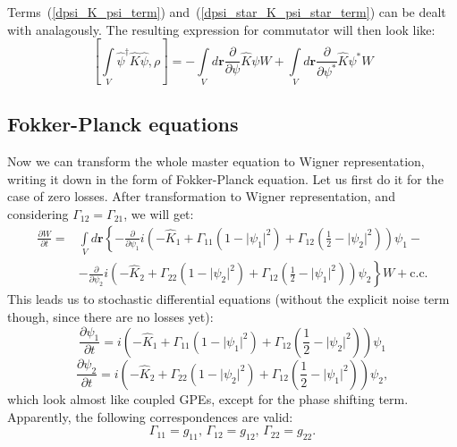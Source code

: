 \documentclass[12pt,notitlepage]{report}
\begin{document}
Terms~(\ref{dpsi_K_psi_term}) and~(\ref{dpsi_star_K_psi_star_term}) can be dealt with analagously.
The resulting expression for commutator will then look like:
\[
[ \int\limits_V \hat{\psi}^\dagger \hat{K} \hat{\psi}, \rho ]  = - \int\limits_V d\mathbf{r} \frac{\partial}{\partial\psi} \hat{K} \psi W +
\int\limits_V d\mathbf{r} \frac{\partial}{\partial\psi^*} \hat{K} \psi^* W
\]

\subsection*{Fokker-Planck equations}

Now we can transform the whole master equation to Wigner representation, writing it down in the form of Fokker-Planck equation.
Let us first do it for the case of zero losses.
After transformation to Wigner representation, and considering $\Gamma_{12} = \Gamma_{21} $, we will get:
\begin{equation*}
\begin{split}
\frac{\partial W}{\partial t} = & \int\limits_V d\mathbf{r} \left\{ - \frac{\partial}{\partial \psi_1} i \left( - \hat{K}_1 +
\Gamma_{11} \left( 1 - \lvert \psi_1 \rvert^2 \right) +
\Gamma_{12} \left( \frac{1}{2} - \lvert \psi_2 \rvert^2 \right) \right) \psi_1 - \right. \\
& \left. - \frac{\partial}{\partial \psi_2} i \left( - \hat{K}_2 + \Gamma_{22} \left( 1 - \lvert \psi_2 \rvert^2 \right) +
\Gamma_{12} \left( \frac{1}{2} - \lvert \psi_1 \rvert^2 \right) \right) \psi_2 \right\} W +
\textrm{c.c.}
\end{split}
\end{equation*}
This leads us to stochastic differential equations (without the explicit noise term though, since there are no losses yet):
\[
\frac{\partial \psi_1}{\partial t} = i \left( - \hat{K}_1 + \Gamma_{11} \left( 1 - \lvert \psi_1 \rvert^2 \right) +
\Gamma_{12} \left( \frac{1}{2} - \lvert \psi_2 \rvert^2 \right) \right) \psi_1
\]
\[
\frac{\partial \psi_2}{\partial t} = i \left( - \hat{K}_2 + \Gamma_{22} \left( 1 - \lvert \psi_2 \rvert^2 \right) +
\Gamma_{12} \left( \frac{1}{2} - \lvert \psi_1 \rvert^2 \right) \right) \psi_2,
\]
which look almost like coupled GPEs, except for the phase shifting term.
Apparently, the following correspondences are valid:
\[
\Gamma_{11} = g_{11},\, \Gamma_{12} = g_{12},\, \Gamma_{22} = g_{22}.
\]
\end{document}
